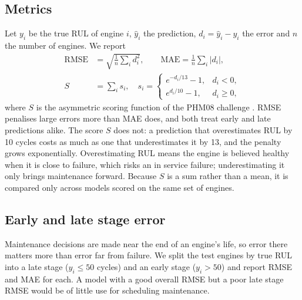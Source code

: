 \subsection{Metrics}
Let $y_i$ be the true RUL of engine $i$, $\hat{y}_i$ the prediction,
$d_i = \hat{y}_i - y_i$ the error and $n$ the number of engines. We report
\begin{align}
\mathrm{RMSE} &= \sqrt{\tfrac{1}{n}\textstyle\sum_{i} d_i^2}, \qquad
\mathrm{MAE} = \tfrac{1}{n}\textstyle\sum_{i} \lvert d_i \rvert, \\
S &= \sum_{i} s_i, \quad
s_i =
\begin{cases}
e^{-d_i/13} - 1, & d_i < 0,\\
e^{d_i/10} - 1, & d_i \ge 0,
\end{cases}
\end{align}
where $S$ is the asymmetric scoring function of the PHM08 challenge
\cite{saxena2008damage}. RMSE penalises large errors more than MAE does,
and both treat early and late predictions alike. The score $S$ does not: a
prediction that overestimates RUL by 10 cycles costs as much as one that
underestimates it by 13, and the penalty grows exponentially. Overestimating
RUL means the engine is believed healthy when it is close to failure, which
risks an in service failure; underestimating it only brings maintenance
forward. Because $S$ is a sum rather than a mean, it is compared only across
models scored on the same set of engines.

\subsection{Early and late stage error}
Maintenance decisions are made near the end of an engine's life, so error
there matters more than error far from failure. We split the test engines by
true RUL into a late stage ($y_i \le 50$ cycles) and an early stage
($y_i > 50$) and report RMSE and MAE for each. A model with a good overall
RMSE but a poor late stage RMSE would be of little use for scheduling
maintenance.
